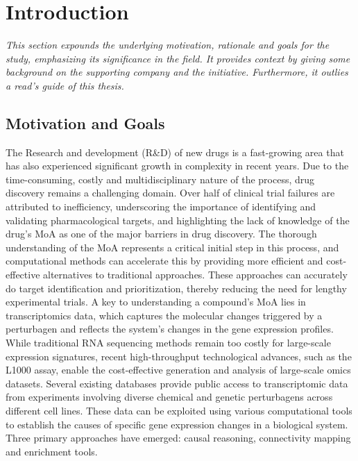 
%

\chapter{Introduction}
\label{cha:introduction}

\textit{This section expounds the underlying motivation, rationale and goals for the study, emphasizing its significance in the field. It provides context by giving some background on the supporting company and the initiative. Furthermore, it outlies a read’s guide of this thesis.}

\section{Motivation and Goals} %
\label{sec:motivation_and_goals}

The Research and development (R\&D) of new drugs is a fast-growing area that has also experienced significant growth in complexity in recent years. Due to the time-consuming, costly and multidisciplinary nature of the process, drug discovery remains a challenging domain. Over half of clinical trial failures are attributed to inefficiency, underscoring the importance of identifying and validating pharmacological targets, and highlighting the lack of knowledge of the drug’s \gls{MoA} as one of the major barriers in drug discovery. The thorough understanding of the MoA represents a critical initial step in this process, and computational methods can accelerate this by providing more efficient and cost-effective alternatives to traditional approaches. These approaches can accurately do target identification and prioritization, thereby reducing the need for lengthy experimental trials.
A key to understanding a compound’s \gls{MoA} lies in transcriptomics data, which captures the molecular changes triggered by a perturbagen and reflects the system’s changes in the gene expression profiles. While traditional RNA sequencing methods remain too costly for large-scale expression signatures, recent high-throughput technological advances, such as the L1000 assay, enable the cost-effective generation and analysis of large-scale omics datasets. Several existing databases provide public access to transcriptomic data from experiments involving diverse chemical and genetic perturbagens across different cell lines. These data can be exploited using various computational tools to establish the causes of specific gene expression changes in a biological system. Three primary approaches have emerged: causal reasoning, connectivity mapping and enrichment tools.

